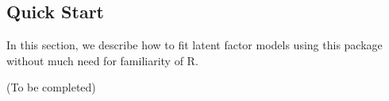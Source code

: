 
\subsection{Quick Start}
\label{sec:bst-quick-start}

In this section, we describe how to fit latent factor models using this package without much need for familiarity of R.
\begin{center}
(To be completed)
\end{center}

